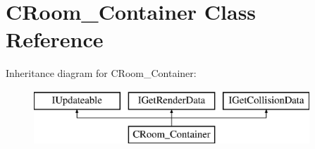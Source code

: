 \hypertarget{classCRoom__Container}{\section{C\-Room\-\_\-\-Container Class Reference}
\label{classCRoom__Container}
}
Inheritance diagram for C\-Room\-\_\-\-Container\-:\begin{figure}[H]
\begin{center}
\leavevmode
\includegraphics[height=2.000000cm]{classCRoom__Container}
\end{center}
\end{figure}
